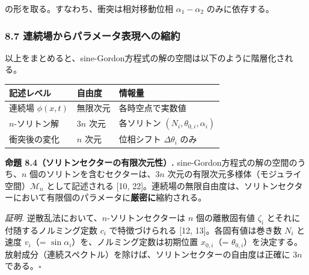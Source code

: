 \documentclass[a4paper,11pt]{ltjsarticle}
\newcounter{none}
\begin{document}
の形を取る。すなわち、衝突は相対移動位相 \(\alpha_1 - \alpha_2\)
のみに依存する。

\subsubsection{8.7
連続場からパラメータ表現への縮約}\label{ux9023ux7d9aux5834ux304bux3089ux30d1ux30e9ux30e1ux30fcux30bfux8868ux73feux3078ux306eux7e2eux7d04}

以上をまとめると、sine-Gordon方程式の解の空間は以下のように階層化される。

{\def\LTcaptype{none} %
\begin{longtable}[]{@{}
  >{\centering\arraybackslash}p{}
  >{\centering\arraybackslash}p{}
  >{\centering\arraybackslash}p{}@{}}
\toprule\noalign{}
\begin{minipage}[b]{\linewidth}\centering
記述レベル
\end{minipage} & \begin{minipage}[b]{\linewidth}\centering
自由度
\end{minipage} & \begin{minipage}[b]{\linewidth}\centering
情報量
\end{minipage} \\
\midrule\noalign{}
\endhead
\bottomrule\noalign{}
\endlastfoot
連続場 \(\phi(x, t)\) & 無限次元 & 各時空点で実数値 \\
\(n\)-ソリトン解 & \(3n\) 次元 & 各ソリトン
\((N_i, \theta_{0,i}, \alpha_i)\) \\
衝突後の変化 & \(n\) 次元 & 位相シフト \(\Delta\theta_i\) のみ \\
\end{longtable}
}

\textbf{命題 8.4（ソリトンセクターの有限次元性）.}
sine-Gordon方程式の解の空間のうち、\(n\)
個のソリトンを含むセクターは、\(3n\)
次元の有限次元多様体（モジュライ空間）\(\mathcal{M}_n\) として記述される
{[}10,
22{]}。連続場の無限自由度は、ソリトンセクターにおいて有限個のパラメータに\textbf{厳密に}縮約される。

\emph{証明.} 逆散乱法において、\(n\)-ソリトンセクターは \(n\)
個の離散固有値 \(\zeta_i\) とそれに付随するノルミング定数 \(c_i\)
で特徴づけられる {[}12, 13{]}。各固有値は巻き数 \(N_i\) と速度
\(v_i\)（= \(\sin\alpha_i\)）を、ノルミング定数は初期位置 \(x_{0,i}\)（=
\(\theta_{0,i}\)）を決定する。放射成分（連続スペクトル）を除けば、ソリトンセクターの自由度は正確に
\(3n\) である。\(\square\)
\end{document}
